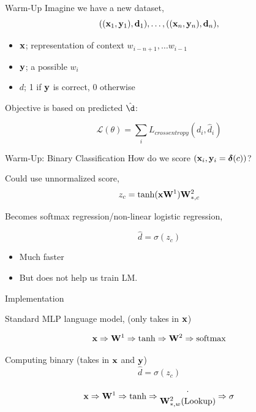 \documentclass{beamer}
\begin{document}
\begin{frame}{Warm-Up}
  Imagine we have a new dataset, 
  \[ ((\mathbf{x}_1, \mathbf{y}_1), \mathbf{d}_1),\ldots, ((\mathbf{x}_n, \mathbf{y}_n), \mathbf{d}_n), \]
  
  \begin{itemize}
  \item $\mathbf{x}$; representation of context  $w_{i-n+1}, \ldots w_{i-1}$ 
  \item $\mathbf{y}$; a possible $w_i$
  \item $d$; 1 if $\mathbf{y}$ is correct, 0 otherwise
  \end{itemize}
  
  Objective is based on predicted $\hat{\d}$:

  \[ \mathcal{L}(\theta) = \sum_{i} L_{crossentropy}(d_i, \hat{d}_i) \] 

\end{frame}


\begin{frame}{Warm-Up: Binary Classification}
  How do we score $(\mathbf{x}_i, \mathbf{y}_i = \boldsymbol{\delta}(c))$? 
\air 

Could use unnormalized score,
  \[ z_c = \tanh(\mathbf{x} \mathbf{W}^1)\mathbf{W}^2_{*,c}  \] 


  Becomes softmax regression/non-linear logistic regression,

  \[\hat{d} = \sigma(z_c)\]

  \begin{itemize}
  \item Much faster
  \item  But does not help us train LM.
  \end{itemize}

\end{frame}


\begin{frame}{Implementation}
  
  Standard MLP language model, (only takes in $\mathbf{x}$) 

  \[\boldx \Rightarrow \boldW^1 \Rightarrow \tanh \Rightarrow  \boldW^2 \Rightarrow \softmax\]



  Computing binary  (takes in $\mathbf{x}$ and $\mathbf{y}$) 
  \[\hat{d} = \sigma(z_c)\]

 \[\mathbf{x} \Rightarrow \mathbf{W}^1 \Rightarrow \tanh \Rightarrow
 \begin{matrix}
   \cdot \\ 
   \mathbf{W}^2_{*, w} \mathrm{(Lookup)}
 \end{matrix}
\Rightarrow \sigma\]
\end{frame}
\end{document}

